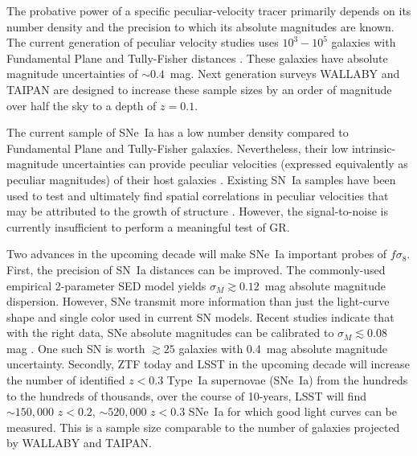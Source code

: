 \documentclass{aastex62}   	%
\begin{document}
The probative power of a specific peculiar-velocity tracer primarily depends on its number density and the precision to which its absolute magnitudes are known.
The current generation of peculiar velocity studies uses $10^3-10^5$ galaxies with Fundamental Plane and Tully-Fisher distances \citep{2008AJ....135.1738M, 2014MNRAS.445.2677S,
2016AJ....152...50T}.  These galaxies have absolute magnitude uncertainties of $\sim 0.4$~mag. 
Next generation surveys WALLABY \citep{2008ExA....22..151J} and TAIPAN \citep{2017PASA...34...47D} are designed to increase these sample sizes by an order of magnitude
over half the sky to a depth of $z=0.1$.


The current sample of SNe~Ia has a low number density compared to Fundamental Plane and Tully-Fisher galaxies.
Nevertheless, their low intrinsic-magnitude uncertainties 
can provide peculiar velocities (expressed equivalently as peculiar magnitudes)
of their host galaxies \citep{2006PhRvD..73l3526H,2011ApJ...741...67D}.  Existing SN~Ia samples
have been used to test and ultimately find spatial correlations in peculiar velocities that may be attributed to the growth of structure
\citep{2008MNRAS.389L..47A,2015JCAP...12..033H, 2017JCAP...05..015H}.
However, the signal-to-noise is currently insufficient to perform a meaningful test of GR.

Two advances in the upcoming decade will make SNe~Ia  important probes of $f\sigma_8$.
First, the precision of SN~Ia distances can be improved.  The commonly-used empirical 2-parameter SED model yields $\sigma_M \gtrsim 0.12$~mag absolute magnitude
dispersion.  However, SNe transmit more information than just the light-curve shape and single color used in current SN models.
Recent studies indicate that with the right data, SNe absolute
magnitudes can be calibrated to $\sigma_M \lesssim 0.08$ mag \citep[see e.g.][]{2012MNRAS.425.1007B, 2015ApJ...815...58F}.
One such SN is worth $\gtrsim 25$ galaxies with 0.4~mag absolute magnitude uncertainty.
Secondly,  ZTF today and LSST in the upcoming decade will increase the number of identified  $z<0.3$ Type~Ia supernovae (SNe~Ia)  from the hundreds to the
hundreds of thousands, over the course of 10-years, LSST will find $\sim150,000$ $z<0.2$,  $\sim520,000$ $z<0.3$ SNe~Ia for which good light curves can be measured. This is a sample size comparable to the number of galaxies projected by WALLABY and TAIPAN.
\end{document}
